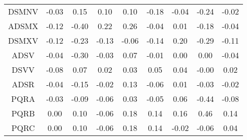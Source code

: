 \documentclass[11pt,a4paper]{report}
\begin{document}
\begin{longtable}{ | c || c | c | c | c | c | c | c || c |}
DSMNV &  \cellcolor[HTML]{FFFFFF} -0.03 &  \cellcolor[HTML]{FFFFFF} 0.15 &  \cellcolor[HTML]{FFFFFF} 0.10 &  \cellcolor[HTML]{FFFFFF} 0.10 &  \cellcolor[HTML]{FFF7F7} -0.18 &  \cellcolor[HTML]{FFFFFF} -0.04 &  \cellcolor[HTML]{FFF7F7} -0.24 &  \cellcolor[HTML]{FFFFFF} -0.02 \\
ADSMX &  \cellcolor[HTML]{FFFFFF} -0.12 &  \cellcolor[HTML]{FFF7F7} -0.40 &  \cellcolor[HTML]{F7F7FF} 0.22 &  \cellcolor[HTML]{F7F7FF} 0.26 &  \cellcolor[HTML]{FFFFFF} -0.04 &  \cellcolor[HTML]{FFFFFF} 0.01 &  \cellcolor[HTML]{FFF7F7} -0.18 &  \cellcolor[HTML]{FFFFFF} -0.04 \\
DSMXV &  \cellcolor[HTML]{FFFFFF} -0.12 &  \cellcolor[HTML]{FFF7F7} -0.23 &  \cellcolor[HTML]{FFFFFF} -0.13 &  \cellcolor[HTML]{FFFFFF} -0.06 &  \cellcolor[HTML]{FFFFFF} -0.14 &  \cellcolor[HTML]{F7F7FF} 0.20 &  \cellcolor[HTML]{FFF7F7} -0.29 &  \cellcolor[HTML]{FFFFFF} -0.11 \\
ADSV &  \cellcolor[HTML]{FFFFFF} -0.04 &  \cellcolor[HTML]{FFF7F7} -0.30 &  \cellcolor[HTML]{FFFFFF} -0.03 &  \cellcolor[HTML]{FFFFFF} 0.07 &  \cellcolor[HTML]{FFFFFF} -0.01 &  \cellcolor[HTML]{FFFFFF} 0.00 &  \cellcolor[HTML]{FFFFFF} 0.00 &  \cellcolor[HTML]{FFFFFF} -0.04 \\
DSVV &  \cellcolor[HTML]{FFFFFF} -0.08 &  \cellcolor[HTML]{FFFFFF} 0.07 &  \cellcolor[HTML]{FFFFFF} 0.02 &  \cellcolor[HTML]{FFFFFF} 0.03 &  \cellcolor[HTML]{FFFFFF} 0.05 &  \cellcolor[HTML]{FFFFFF} 0.04 &  \cellcolor[HTML]{FFFFFF} -0.00 &  \cellcolor[HTML]{FFFFFF} 0.02 \\
ADSR &  \cellcolor[HTML]{FFFFFF} -0.04 &  \cellcolor[HTML]{FFFFFF} -0.15 &  \cellcolor[HTML]{FFFFFF} -0.02 &  \cellcolor[HTML]{FFFFFF} 0.13 &  \cellcolor[HTML]{FFFFFF} -0.06 &  \cellcolor[HTML]{FFFFFF} 0.01 &  \cellcolor[HTML]{FFFFFF} -0.03 &  \cellcolor[HTML]{FFFFFF} -0.02 \\
PQRA &  \cellcolor[HTML]{FFFFFF} -0.03 &  \cellcolor[HTML]{FFFFFF} -0.09 &  \cellcolor[HTML]{FFFFFF} -0.06 &  \cellcolor[HTML]{FFFFFF} 0.03 &  \cellcolor[HTML]{FFFFFF} -0.05 &  \cellcolor[HTML]{FFFFFF} 0.06 &  \cellcolor[HTML]{FFF7F7} -0.44 &  \cellcolor[HTML]{FFFFFF} -0.08 \\
PQRB &  \cellcolor[HTML]{FFFFFF} 0.00 &  \cellcolor[HTML]{FFFFFF} 0.10 &  \cellcolor[HTML]{FFFFFF} -0.06 &  \cellcolor[HTML]{F7F7FF} 0.18 &  \cellcolor[HTML]{FFFFFF} 0.14 &  \cellcolor[HTML]{F7F7FF} 0.16 &  \cellcolor[HTML]{F7F7FF} 0.46 &  \cellcolor[HTML]{FFFFFF} 0.14 \\
PQRC &  \cellcolor[HTML]{FFFFFF} 0.00 &  \cellcolor[HTML]{FFFFFF} 0.10 &  \cellcolor[HTML]{FFFFFF} -0.06 &  \cellcolor[HTML]{F7F7FF} 0.18 &  \cellcolor[HTML]{FFFFFF} 0.14 &  \cellcolor[HTML]{FFFFFF} -0.02 &  \cellcolor[HTML]{FFFFFF} -0.06 &  \cellcolor[HTML]{FFFFFF} 0.04 \\

\end{longtable}
\end{document}
